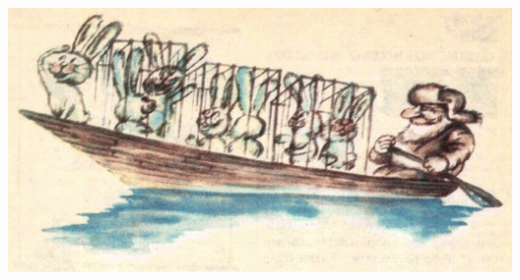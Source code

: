 \documentclass[main.tex]{subfiles}
\begin{document}
\begin{center}
\includegraphics[width=1\textwidth]{picture}
\end{center}
\end{document}
